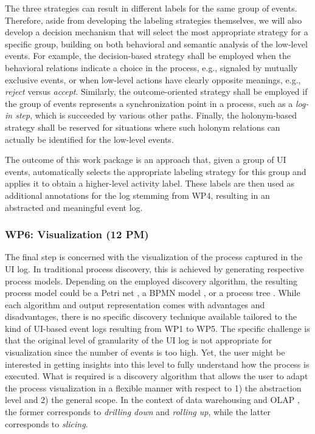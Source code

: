  The three strategies can result in different labels for the same group of events. Therefore, aside from developing the labeling strategies themselves, we will also develop a decision mechanism that will select the most appropriate strategy for a specific group, building on both behavioral and semantic analysis of the low-level events. For example, the decision-based strategy shall be employed when the behavioral relations indicate a choice in the process, e.g., signaled by mutually exclusive events, or when low-level actions have clearly opposite meanings, e.g., \emph{reject} versus \emph{accept}. Similarly, the outcome-oriented strategy shall be employed if the group of events represents a synchronization point in a process, such as a \emph{log-in step}, which is succeeded by various other paths. Finally, the holonym-based strategy shall be reserved for situations where such holonym relations can actually be identified for the low-level events. 

 The outcome of this work package is an approach that, given a group of UI events, automatically selects the appropriate labeling strategy for this group and applies it to obtain a higher-level activity label. These labels are then used as additional annotations for the log stemming from WP4, resulting in an abstracted and meaningful event log. 

\newpage
\subsubsection{WP6: Visualization (12 PM)}
\label{sec:wp6}

The final step is concerned with the visualization of the process captured in the UI log. In traditional process discovery, this is achieved by generating respective process models. Depending on the employed discovery algorithm, the resulting process model could be a Petri net \cite{van2004workflow}, a BPMN model \cite{conforti2016bpmn}, or a process tree \cite{leemans2013discovering}. While each algorithm and output representation comes with advantages and disadvantages, there is no specific discovery technique available tailored to the kind of UI-based event logs resulting from WP1 to WP5. %
The specific challenge is that the original level of granularity of the UI log is not appropriate for visualization since the number of events is too high. Yet, the user might be interested in getting insights into this level to fully understand how the process is executed. What is required is a discovery algorithm that allows the user to adapt the process visualization in a flexible manner with respect to 1) the abstraction level and 2) the general scope. In the context of data warehousing and OLAP \cite{chaudhuri1997overview}, the former corresponds to \textit{drilling down} and \textit{rolling up}, while the latter corresponds to \textit{slicing}. 

